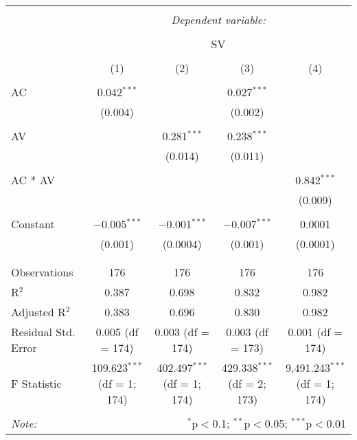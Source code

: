 
\begin{table}[!htbp] \centering 
  \caption{} 
  \label{} 
\begin{tabular}{@{\extracolsep{5pt}}lcccc} 
\\[-1.8ex]\hline 
\hline \\[-1.8ex] 
 & \multicolumn{4}{c}{\textit{Dependent variable:}} \\ 
\cline{2-5} 
\\[-1.8ex] & \multicolumn{4}{c}{SV} \\ 
\\[-1.8ex] & (1) & (2) & (3) & (4)\\ 
\hline \\[-1.8ex] 
 AC & 0.042$^{***}$ &  & 0.027$^{***}$ &  \\ 
  & (0.004) &  & (0.002) &  \\ 
  & & & & \\ 
 AV &  & 0.281$^{***}$ & 0.238$^{***}$ &  \\ 
  &  & (0.014) & (0.011) &  \\ 
  & & & & \\ 
 AC * AV &  &  &  & 0.842$^{***}$ \\ 
  &  &  &  & (0.009) \\ 
  & & & & \\ 
 Constant & $-$0.005$^{***}$ & $-$0.001$^{***}$ & $-$0.007$^{***}$ & 0.0001 \\ 
  & (0.001) & (0.0004) & (0.001) & (0.0001) \\ 
  & & & & \\ 
\hline \\[-1.8ex] 
Observations & 176 & 176 & 176 & 176 \\ 
R$^{2}$ & 0.387 & 0.698 & 0.832 & 0.982 \\ 
Adjusted R$^{2}$ & 0.383 & 0.696 & 0.830 & 0.982 \\ 
Residual Std. Error & 0.005 (df = 174) & 0.003 (df = 174) & 0.003 (df = 173) & 0.001 (df = 174) \\ 
F Statistic & 109.623$^{***}$ (df = 1; 174) & 402.497$^{***}$ (df = 1; 174) & 429.338$^{***}$ (df = 2; 173) & 9,491.243$^{***}$ (df = 1; 174) \\ 
\hline 
\hline \\[-1.8ex] 
\textit{Note:}  & \multicolumn{4}{r}{$^{*}$p$<$0.1; $^{**}$p$<$0.05; $^{***}$p$<$0.01} \\ 
\end{tabular} 
\end{table} 

